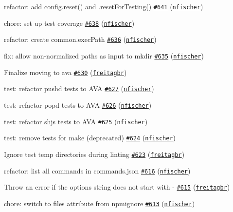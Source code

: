 \begin{DoxyItemize}
\item refactor\+: add config.\+reset() and .reset\+For\+Testing() \href{https://github.com/shelljs/shelljs/pull/641}{\tt \#641} (\href{https://github.com/nfischer}{\tt nfischer})
\item chore\+: set up test coverage \href{https://github.com/shelljs/shelljs/pull/638}{\tt \#638} (\href{https://github.com/nfischer}{\tt nfischer})
\item refactor\+: create common.\+exec\+Path \href{https://github.com/shelljs/shelljs/pull/636}{\tt \#636} (\href{https://github.com/nfischer}{\tt nfischer})
\item fix\+: allow non-\/normalized paths as input to mkdir \href{https://github.com/shelljs/shelljs/pull/635}{\tt \#635} (\href{https://github.com/nfischer}{\tt nfischer})
\item Finalize moving to ava \href{https://github.com/shelljs/shelljs/pull/630}{\tt \#630} (\href{https://github.com/freitagbr}{\tt freitagbr})
\item test\+: refactor pushd tests to A\+VA \href{https://github.com/shelljs/shelljs/pull/627}{\tt \#627} (\href{https://github.com/nfischer}{\tt nfischer})
\item test\+: refactor popd tests to A\+VA \href{https://github.com/shelljs/shelljs/pull/626}{\tt \#626} (\href{https://github.com/nfischer}{\tt nfischer})
\item test\+: refactor shjs tests to A\+VA \href{https://github.com/shelljs/shelljs/pull/625}{\tt \#625} (\href{https://github.com/nfischer}{\tt nfischer})
\item test\+: remove tests for make (deprecated) \href{https://github.com/shelljs/shelljs/pull/624}{\tt \#624} (\href{https://github.com/nfischer}{\tt nfischer})
\item Ignore test temp directories during linting \href{https://github.com/shelljs/shelljs/pull/623}{\tt \#623} (\href{https://github.com/freitagbr}{\tt freitagbr})
\item refactor\+: list all commands in commands.\+json \href{https://github.com/shelljs/shelljs/pull/616}{\tt \#616} (\href{https://github.com/nfischer}{\tt nfischer})
\item Throw an error if the options string does not start with \textquotesingle{}-\/\textquotesingle{} \href{https://github.com/shelljs/shelljs/pull/615}{\tt \#615} (\href{https://github.com/freitagbr}{\tt freitagbr})
\item chore\+: switch to files attribute from npmignore \href{https://github.com/shelljs/shelljs/pull/613}{\tt \#613} (\href{https://github.com/nfischer}{\tt nfischer})

\end{DoxyItemize}
